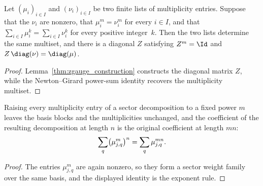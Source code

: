 \begin{lemma}
    \label{thm:equalcase_zgauge_power_sums}
    \leanok
    Let $(\mu_i)_{i\in I}$ and $(\nu_i)_{i\in I}$ be two finite lists of
    multiplicity entries. Suppose that the $\nu_i$ are nonzero, that
    $\mu_i^m=\nu_i^m$ for every $i\in I$, and that
    $\sum_{i\in I}\mu_i^k=\sum_{i\in I}\nu_i^k$ for every positive
    integer~$k$. Then the two lists determine the same multiset, and there is
    a diagonal $Z$ satisfying $Z^m=\Id$ and
    $Z\,\diag(\nu)=\diag(\mu)$.
\end{lemma}

\begin{proof}\leanok
    Lemma~\ref{thm:zgauge_construction} constructs the diagonal matrix $Z$,
    while the Newton--Girard power-sum identity recovers the multiplicity
    multiset.
\end{proof}

\begin{lemma}%
    \label{lem:sector_power_weights}
    \leanok
    Raising every multiplicity entry of a sector decomposition to a fixed
    power $m$ leaves the basis blocks and the multiplicities unchanged, and
    the coefficient of the resulting decomposition at length $n$ is the
    original coefficient at length $mn$:
    \begin{align}
        \sum_{q}\bigl(\mu_{j,q}^{m}\bigr)^{n}
        =\sum_{q}\mu_{j,q}^{mn}.
        \notag
    \end{align}
\end{lemma}

\begin{proof}\leanok
    The entries $\mu_{j,q}^{m}$ are again nonzero, so they form a sector
    weight family over the same basis, and the displayed identity is the
    exponent rule.
\end{proof}

